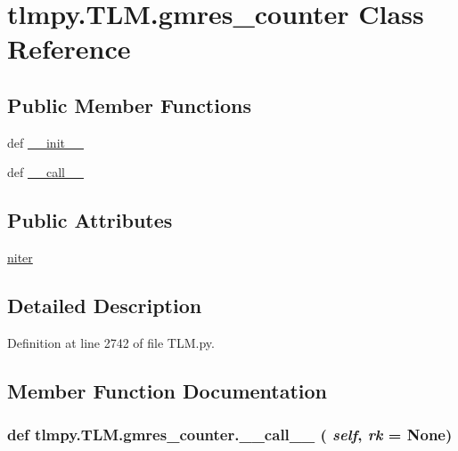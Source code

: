 \hypertarget{classtlmpy_1_1TLM_1_1gmres__counter}{
\section{tlmpy.TLM.gmres\_\-counter Class Reference}
\label{classtlmpy_1_1TLM_1_1gmres__counter}
}
\subsection*{Public Member Functions}
\begin{DoxyCompactItemize}
\item 
def \hyperlink{classtlmpy_1_1TLM_1_1gmres__counter_a41615401fca2f1153168701d66c18da9}{\_\-\_\-init\_\-\_\-}
\item 
def \hyperlink{classtlmpy_1_1TLM_1_1gmres__counter_afce83316bbeeaf7c446b9fa5a81faa4d}{\_\-\_\-call\_\-\_\-}
\end{DoxyCompactItemize}
\subsection*{Public Attributes}
\begin{DoxyCompactItemize}
\item 
\hyperlink{classtlmpy_1_1TLM_1_1gmres__counter_af98b42fd7b48019d2a033c9512982f04}{niter}
\end{DoxyCompactItemize}


\subsection{Detailed Description}


Definition at line 2742 of file TLM.py.

\subsection{Member Function Documentation}
\hypertarget{classtlmpy_1_1TLM_1_1gmres__counter_afce83316bbeeaf7c446b9fa5a81faa4d}{
\subsubsection[{\_\-\_\-call\_\-\_\-}]{\setlength{\rightskip}{0pt plus 5cm}def tlmpy.TLM.gmres\_\-counter.\_\-\_\-call\_\-\_\- ( {\em self}, \/   {\em rk} = {\ttfamily None})}}
\label{classtlmpy_1_1TLM_1_1gmres__counter_afce83316bbeeaf7c446b9fa5a81faa4d}


